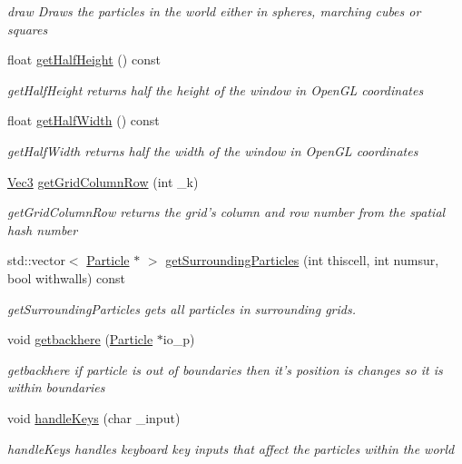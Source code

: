 \begin{DoxyCompactItemize}
\begin{DoxyCompactList}\small\item\em draw Draws the particles in the world either in spheres, marching cubes or squares \end{DoxyCompactList}\item 
float \hyperlink{classWorld_abf6fa37003722e1fba8862f6eb299c2d}{get\-Half\-Height} () const 
\begin{DoxyCompactList}\small\item\em get\-Half\-Height returns half the height of the window in Open\-G\-L coordinates \end{DoxyCompactList}\item 
float \hyperlink{classWorld_a68605fd591772396a7ffbc3dcc1802a2}{get\-Half\-Width} () const 
\begin{DoxyCompactList}\small\item\em get\-Half\-Width returns half the width of the window in Open\-G\-L coordinates \end{DoxyCompactList}\item 
\hyperlink{classVec3}{Vec3} \hyperlink{classWorld_ae87279ec231161c8e41f1839f47c8dac}{get\-Grid\-Column\-Row} (int \-\_\-k)
\begin{DoxyCompactList}\small\item\em get\-Grid\-Column\-Row returns the grid's column and row number from the spatial hash number \end{DoxyCompactList}\item 
std\-::vector$<$ \hyperlink{classParticle}{Particle} $\ast$ $>$ \hyperlink{classWorld_a0c93ff0f6b57f9f45160e3fc985f318f}{get\-Surrounding\-Particles} (int thiscell, int numsur, bool withwalls) const 
\begin{DoxyCompactList}\small\item\em get\-Surrounding\-Particles gets all particles in surrounding grids. \end{DoxyCompactList}\item 
void \hyperlink{classWorld_a0847c4e3dc1a17791949ac49aaba449b}{getbackhere} (\hyperlink{classParticle}{Particle} $\ast$io\-\_\-p)
\begin{DoxyCompactList}\small\item\em getbackhere if particle is out of boundaries then it's position is changes so it is within boundaries \end{DoxyCompactList}\item 
void \hyperlink{classWorld_a738c729dace44a14ec64529eb47aae3b}{handle\-Keys} (char \-\_\-input)
\begin{DoxyCompactList}\small\item\em handle\-Keys handles keyboard key inputs that affect the particles within the world \end{DoxyCompactList}\item 

\end{DoxyCompactItemize}
